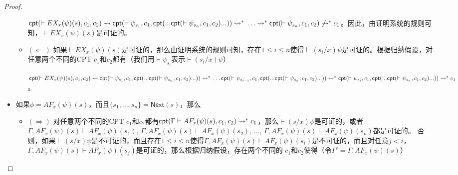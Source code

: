 \begin{proof}
\begin{itemize}
\begin{itemize}
			$\textsf{cpt}(\vdash
			EX_x(\psi)(s), c_1, c_2)\rightsquigarrow \\ 
			\textsf{cpt}(\vdash \psi_{s_1}, c_1,
			\textsf{cpt}(...\textsf{cpt}(\vdash\psi_{s_n}, c_1,
			c_2)...))\rightsquigarrow^* \\ 
			\ldots \rightsquigarrow^*\\
			\textsf{cpt}(\vdash\psi_{s_n}, c_1, c_2)\not\rightsquigarrow^* c_1$。因此，由证明系统的规则可知，$\vdash EX_x(\psi)(s)$是可证的。
			\item $(\Leftarrow)$ 如果$\vdash EX_x(\psi)(s)$是可证的，那么由证明系统的规则可知，存在$1\le i\le n$使得$\vdash (s_i/x)\psi$是可证的。根据归纳假设，对任意两个不同的\textsf{CPT} $c_1$和$c_2$都有（我们用$\vdash\psi_{s_i}$表示$\vdash(s_i/x)\psi$） 
			
			$\textsf{cpt}(\vdash EX_x(\psi)(s), c_1, c_2)\rightsquigarrow \\ 
			\textsf{cpt}(\vdash\psi_{s_1}, c_1,
			\textsf{cpt}(...\textsf{cpt}(\vdash\psi_{s_n}, c_1,
			c_2)...))\rightsquigarrow^* \\ 
			\ldots\\
			\textsf{cpt}(\vdash\psi_{s_{i-1}}, c_1,
			\textsf{cpt}(...\textsf{cpt}(\vdash\psi_{s_n}, c_1,
			c_2)...))\rightsquigarrow^*\\
			\textsf{cpt}(\vdash\psi_{s_i}, c_1,
			\textsf{cpt}(...\textsf{cpt}(\vdash\psi_{s_n}, c_1,
			c_2)...))\rightsquigarrow^*c_1$。
		\end{itemize}
		
		\item 如果$\phi = AF_x(\psi)(s)$，而且$\{s_1,...,s_n\}=\textsf{Next}(s)$，那么
		\begin{itemize}
			\item $(\Rightarrow)$ 对任意两个不同的\textsf{CPT} $c_1$和$c_2$都有$\textsf{cpt}(\Gamma\vdash AF_x(\psi)(s), c_1, c_2)\rightsquigarrow^* c_1$，那么$\vdash(s/x)\psi$是可证的，或者$\Gamma, AF_x(\psi)(s)\vdash
			AF_x(\psi)(s_1)$, $\Gamma , AF_x(\psi)(s)\vdash AF_x(\psi)(s_2)$,
			$...$, $\Gamma , AF_x(\psi)(s)\vdash AF_x(\psi)(s_n)$都是可证的。
			否则，如果$\vdash(s/x)\psi$是不可证的，而且存在$1\le i\le n$使得$\Gamma,AF_x(\psi)(s)\vdash AF_x(\psi)(s_i)$是不可证的，而且对任意$j<i$，$\Gamma,AF_x(\psi)(s)\vdash AF_x(\psi)(s_j)$是可证的，那么根据归纳假设，存在两个不同的\CPT{} $c_1$和$c_2$使得（令$\Gamma'=\Gamma,AF_x(\psi)(s)$）
			

\end{itemize}
\end{itemize}
\end{proof}
